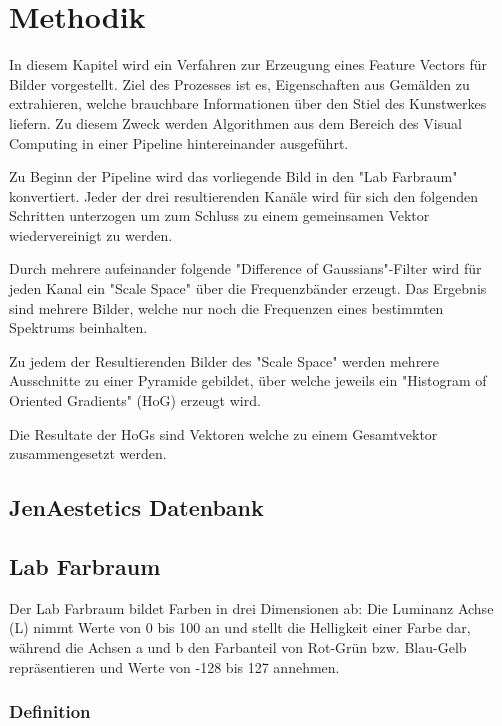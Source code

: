 \chapter{Methodik}

In diesem Kapitel wird ein Verfahren zur Erzeugung eines Feature Vectors für Bilder vorgestellt. Ziel des Prozesses ist es, Eigenschaften aus Gemälden zu extrahieren, welche brauchbare Informationen über den Stiel des Kunstwerkes liefern. Zu diesem Zweck werden Algorithmen aus dem Bereich des Visual Computing in einer Pipeline hintereinander ausgeführt.

Zu Beginn der Pipeline wird das vorliegende Bild in den "Lab Farbraum" konvertiert. Jeder der drei resultierenden Kanäle wird für sich den folgenden Schritten unterzogen um zum Schluss zu einem gemeinsamen Vektor wiedervereinigt zu werden.

Durch mehrere aufeinander folgende "Difference of Gaussians"-Filter wird für jeden Kanal ein "Scale Space" über die Frequenzbänder erzeugt. Das Ergebnis sind mehrere Bilder, welche nur noch die Frequenzen eines bestimmten Spektrums beinhalten.

Zu jedem der Resultierenden Bilder des "Scale Space" werden mehrere Ausschnitte zu einer Pyramide gebildet, über welche jeweils ein "Histogram of Oriented Gradients"  (HoG) erzeugt wird. 

Die Resultate der HoGs sind Vektoren welche zu einem Gesamtvektor zusammengesetzt werden.

\section{JenAestetics Datenbank}

\blindtext

\section{Lab Farbraum}

Der Lab Farbraum bildet Farben in drei Dimensionen ab: Die Luminanz Achse (L) nimmt Werte von 0 bis 100 an und stellt die Helligkeit einer Farbe dar, während die Achsen a und b den Farbanteil von Rot-Grün bzw. Blau-Gelb repräsentieren und Werte von -128 bis 127 annehmen.

\subsection{Definition}

\blindtext

